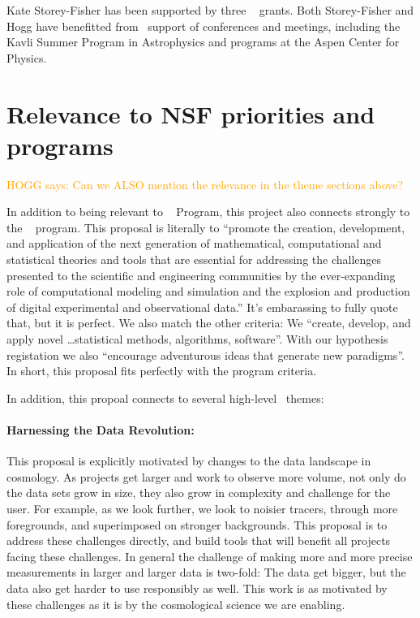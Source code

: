 \documentclass[12pt, fullpage, letterpaper]{article}
\newcommand{\HOGG}[1]{\textcolor{orange}{HOGG says: #1}}
\begin{document}
Kate Storey-Fisher has been supported by three \NSF\  grants.
Both Storey-Fisher and Hogg have benefitted from \NSF\ support of conferences and meetings,
including the Kavli Summer Program in Astrophysics and programs at the Aspen Center for Physics.

\section{Relevance to NSF priorities and programs}

\HOGG{Can we ALSO mention the  relevance in
the theme sections above?}

In addition to being relevant to \NSF\  Program, this
project also connects strongly to the \NSF\ 
program. This proposal is literally to ``promote the creation,
development, and application of the next generation of mathematical,
computational and statistical theories and tools that are essential
for addressing the challenges presented to the scientific and
engineering communities by the ever-expanding role of computational
modeling and simulation and the explosion and production of digital
experimental and observational data.'' It's embarassing to fully quote
that, but it is perfect. We also match the other  criteria:
We ``create, develop, and apply novel \ldots statistical methods, algorithms, software''.
With our hypothesis registation we also ``encourage adventurous ideas that generate
new paradigms''. In short, this proposal fits perfectly with the  program
criteria.

In addition, this propoal connects to several high-level \NSF\ themes:

\paragraph{Harnessing the Data Revolution:}
This proposal is explicitly motivated by changes to the data landscape
in cosmology.  As projects get larger and work to observe more volume,
not only do the data sets grow in size, they also grow in complexity
and challenge for the user.  For example, as we look further, we look
to noisier tracers, through more foregrounds, and superimposed on
stronger backgrounds. This proposal is to address these challenges
directly, and build tools that will benefit all projects facing these
challenges.  In general the challenge of making more and more precise
measurements in larger and larger data is two-fold: The data get
bigger, but the data also get harder to use responsibly as well. This
work is as motivated by these challenges as it is by the cosmological
science we are enabling.
\end{document}
